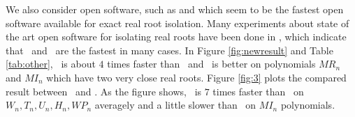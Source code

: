  We also consider open software,  such as  \AND\cite{Tsigaridas2016} and \SLV\cite{kobel2016computing}  which
 seem to be the fastest  open software  available for exact real root isolation. Many experiments  about  state of the art open software for isolating
 real roots have been done in \cite{hemmer09,Tsigaridas2016,kobel2016computing},  which  indicate that      \AND\ and \SLV\
 are  the fastest in many cases.
 In Figure \ref{fig:newresult} and Table \ref{tab:other}, \froot\ is about $4$ times faster than \AND\ and \AND\ is better on polynomials $MR_n$ and $MI_n$ which have two very close real roots.  Figure \ref{fig:3} plots the  compared
 	result between \froot\ and \SLV. As the figure shows, \froot\  is $7$ times faster than  \SLV\ on $W_n,T_n,U_n,H_n,WP_n$ averagely and a little slower than \SLV\ on $MI_n$ polynomials.

\begin{comment}

  We also compare \froot\  with numerical methods  \eign\ \cite{eigsolev} and \sle\ \cite{hemmer09}. As \eign\ computes all the complex roots, we choose $W_n$, $mW_n$ and $IW_n$ as benchmarks with degrees ranging from 10 to 90, which have only real roots. \sle\ computes only real roots but it has weak stability. Its output on $W_{30}$ only has eight real roots, which is obviously wrong. \sle's running time\footnote{When  running time is very short we run every case for more than ten times and compute the mean.} on $W_{10}$ is $0.022$ seconds and
 $0.024$ seconds on $W_{20}$. In these two cases our software is about $7$ times faster than \sle. We compare \froot\ with  \eign\ and the results are  shown in Figure \ref{fig:1}.
 At the beginning when degree is $10$, the time costs of \froot\ and \eign\ are
 almost equal. As degree becoming larger, the growth rate of our tool's consuming-time is much less than that of  \eign.  When degree reaches $90$, \froot\ is about $20$ times faster than \eign.
\end{comment}

